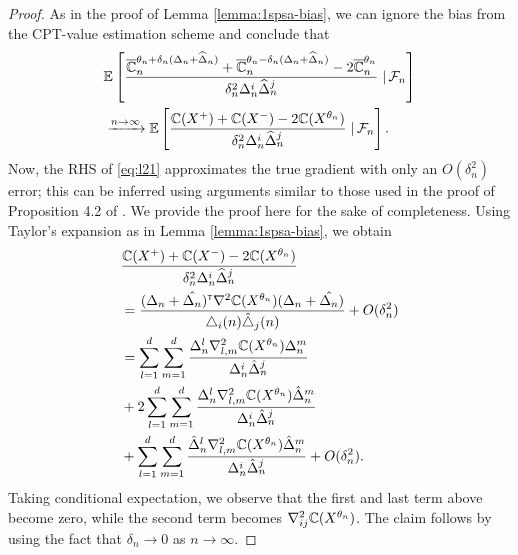 \begin{proof}
As in the proof of Lemma \ref{lemma:1spsa-bias}, we can ignore the bias from the CPT-value estimation scheme and conclude that
\begin{align}
    &\mathbb{E}\left[\dfrac{\overline {\mathbb{C}}_n^{\theta_n+\delta_n(\Delta_n+\widehat\Delta_n)} + \overline {\mathbb{C}}_n^{\theta_n-\delta_n(\Delta_n+\widehat\Delta_n)} - 2\overline {\mathbb{C}}_n^{\theta_n}}{\delta_n^2 \Delta_n^i\widehat\Delta_n^j} \left.\right| \mathcal{F}_n\right]  \nonumber\\
     & \xrightarrow{n\rightarrow\infty} \mathbb{E}\left[\dfrac{\mathbb{C}(X^{+}) + \mathbb{C}(X^{-}) - 2\mathbb{C}(X^{\theta_n})}{\delta_n^2 \Delta_n^i\widehat\Delta_n^j} \left.\right| \mathcal{F}_n\right].  \label{eq:l21}
\end{align}
Now, the RHS of \eqref{eq:l21} approximates the true gradient with only an $O(\delta_n^2)$ error; this can be inferred using arguments similar to those used in the proof of Proposition 4.2 of \cite{bhatnagar2015simultaneous}. We provide the proof here for the sake of completeness.
Using Taylor's expansion as in Lemma \ref{lemma:1spsa-bias}, we obtain
\begin{align*}
&\dfrac{\mathbb{C}(X^{+}) + \mathbb{C}(X^{-}) - 2\mathbb{C}(X^{\theta_n})}{\delta_n^2 \Delta_n^i\widehat\Delta_n^j}\\
&=  \frac{(\Delta_n+\hat{\Delta_n})^\mathsf{\scriptscriptstyle T} \nabla^2 \mathbb{C}(X^{\theta_n})(\Delta_n
+\hat{\Delta_n})}{\triangle_i(n)\hat{\triangle}_j(n)}
+ O(\delta_n^2) \\
&= \sum_{l=1}^{d}\sum_{m=1}^{d} \frac{\Delta_n^l\nabla^2_{l,m}\mathbb{C}(X^{\theta_n})\Delta_n^m}{\Delta_n^i
\hat{\Delta}_n^j}\\
& + 2\sum_{l=1}^{d}\sum_{m=1}^{d} \frac{\Delta_n^l\nabla^2_{l,m}
\mathbb{C}(X^{\theta_n})\hat{\Delta}_n^m}{\Delta_n^i
\hat{\Delta}_n^j}\\
&+ \sum_{l=1}^{d}\sum_{m=1}^{d} \frac{\hat{\Delta}_n^l\nabla^2_{l,m}\mathbb{C}(X^{\theta_n})\hat{\Delta}_n^m}{\Delta_n^i
\hat{\Delta}_n^j} + O(\delta_n^2).
\end{align*}
Taking conditional expectation, we observe that the first and last term above become zero, while the second term becomes $\nabla^2_{ij}
\mathbb{C}(X^{\theta_n})$. The claim follows by using the fact that $\delta_n \rightarrow 0$ as $n\rightarrow \infty$.
\end{proof}

